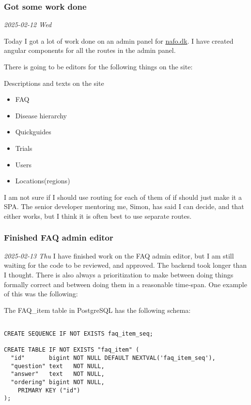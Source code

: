 \documentclass[../main.tex]{subfiles}
\begin{document}
\subsubsection{Got some work done}

\noindent \textit{2025-02-12 Wed}

Today I got a lot of work done on an admin panel for \href{https://www.nationaltforsoegsoverblik.dk/}{nafo.dk}. I have created angular components for all the routes in the admin panel.

There is going to be editors for the following things on the site:

Descriptions and texts on the site

\begin{itemize}
\item FAQ
\item Disease hierarchy
\item Quickguides
\item Trials
\item Users
\item Locations(regions)
\end{itemize}

I am not sure if I should use routing for each of them of if should just make it a SPA. The senior developer mentoring me, Simon, has said I can decide, and that either works, but I think it is often best to use separate routes.

\subsubsection{Finished FAQ admin editor}

\noindent \textit{2025-02-13 Thu} I have finished work on the FAQ admin editor, but I am still waiting for the code to be reviewed, and approved. The backend took longer than I thought. There is also always a prioritization to make between doing things formally correct and between doing them in a reasonable time-span. One example of this was the following:

The FAQ\_item table in PostgreSQL has the following schema:

\begin{verbatim}
    
CREATE SEQUENCE IF NOT EXISTS faq_item_seq;
  
CREATE TABLE IF NOT EXISTS "faq_item" ( 
  "id"       bigint NOT NULL DEFAULT NEXTVAL('faq_item_seq'),
  "question" text   NOT NULL,
  "answer"   text   NOT NULL,
  "ordering" bigint NOT NULL,
    PRIMARY KEY ("id")
);

\end{verbatim}
\end{document}
